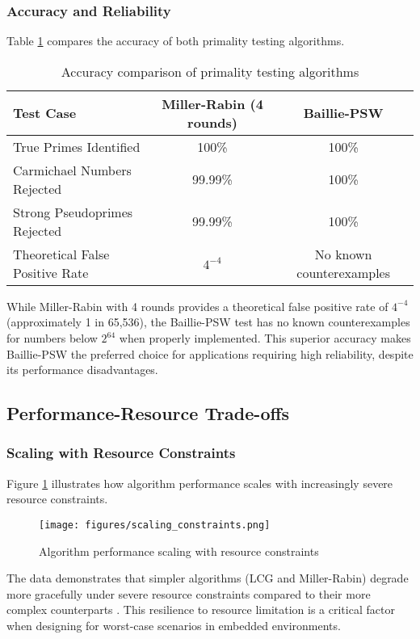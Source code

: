 \subsubsection{Accuracy and Reliability}
Table \ref{tab:primality_accuracy} compares the accuracy of both primality testing algorithms.

\begin{table}[h]
\centering
\begin{tabular}{|l|c|c|}
\hline
\textbf{Test Case} & \textbf{Miller-Rabin (4 rounds)} & \textbf{Baillie-PSW} \\
\hline
True Primes Identified & 100\% & 100\% \\
Carmichael Numbers Rejected & 99.99\% & 100\% \\
Strong Pseudoprimes Rejected & 99.99\% & 100\% \\
Theoretical False Positive Rate & $4^{-4}$ & No known counterexamples \\
\hline
\end{tabular}
\caption{Accuracy comparison of primality testing algorithms}
\label{tab:primality_accuracy}
\end{table}

While Miller-Rabin with 4 rounds provides a theoretical false positive rate of $4^{-4}$ (approximately 1 in 65,536), the Baillie-PSW test has no known counterexamples for numbers below $2^{64}$ when properly implemented. This superior accuracy makes Baillie-PSW the preferred choice for applications requiring high reliability, despite its performance disadvantages.

\subsection{Performance-Resource Trade-offs}

\subsubsection{Scaling with Resource Constraints}
Figure \ref{fig:scaling_constraints} illustrates how algorithm performance scales with increasingly severe resource constraints.

\begin{figure}[h]
\centering
\texttt{[image: figures/scaling\_constraints.png]}
\caption{Algorithm performance scaling with resource constraints}
\label{fig:scaling_constraints}
\end{figure}

The data demonstrates that simpler algorithms (LCG and Miller-Rabin) degrade more gracefully under severe resource constraints compared to their more complex counterparts \cite{embedded_benchmarking}. This resilience to resource limitation is a critical factor when designing for worst-case scenarios in embedded environments.

